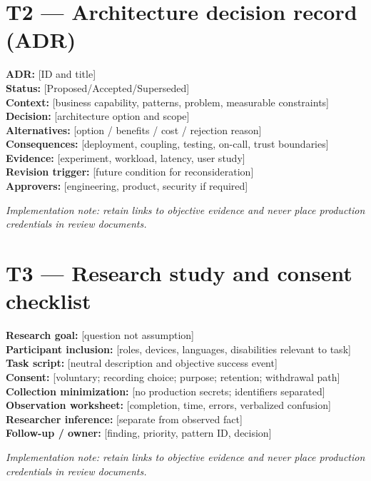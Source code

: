 \documentclass[11pt]{article}
\begin{document}
\section{T2 — Architecture decision record (ADR)}
\begin{notebox}
\textbf{ADR:} [ID and title]\\
\textbf{Status:} [Proposed/Accepted/Superseded]\\
\textbf{Context:} [business capability, patterns, problem, measurable constraints]\\
\textbf{Decision:} [architecture option and scope]\\
\textbf{Alternatives:} [option / benefits / cost / rejection reason]\\
\textbf{Consequences:} [deployment, coupling, testing, on-call, trust boundaries]\\
\textbf{Evidence:} [experiment, workload, latency, user study]\\
\textbf{Revision trigger:} [future condition for reconsideration]\\
\textbf{Approvers:} [engineering, product, security if required]\par\end{notebox}
\textit{Implementation note: retain links to objective evidence and never place production credentials in review documents.}
\section{T3 — Research study and consent checklist}
\begin{notebox}
\textbf{Research goal:} [question not assumption]\\
\textbf{Participant inclusion:} [roles, devices, languages, disabilities relevant to task]\\
\textbf{Task script:} [neutral description and objective success event]\\
\textbf{Consent:} [voluntary; recording choice; purpose; retention; withdrawal path]\\
\textbf{Collection minimization:} [no production secrets; identifiers separated]\\
\textbf{Observation worksheet:} [completion, time, errors, verbalized confusion]\\
\textbf{Researcher inference:} [separate from observed fact]\\
\textbf{Follow-up / owner:} [finding, priority, pattern ID, decision]\par\end{notebox}
\textit{Implementation note: retain links to objective evidence and never place production credentials in review documents.}
\end{document}
